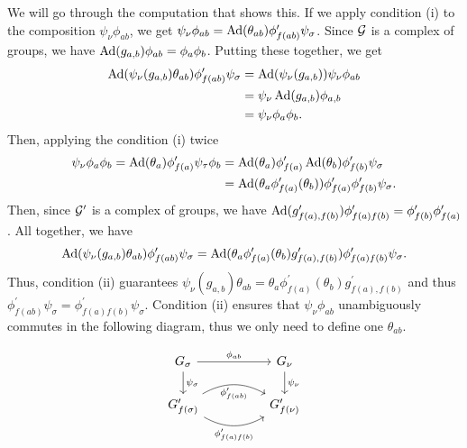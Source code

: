 We will go through the computation that shows this.
If we apply condition (i) to the composition $\psi_\nu \phi_{ab}$, we get $\psi_\nu\phi_{ab} = \operatorname{Ad}(\theta_{ab})\phi^\prime_{f(ab)}\psi_\sigma$.
Since $\mathcal{G}$ is a complex of groups, we have $\operatorname{Ad}(g_{a,b})\phi_{ab} = \phi_a\phi_b$.
Putting these together, we get
\begin{align*}
	\operatorname{Ad}(\psi_\nu(g_{a,b})\theta_{ab})\phi^\prime_{f(ab)}\psi_\sigma
	 & = \operatorname{Ad}(\psi_\nu(g_{a,b}))\psi_\nu\phi_{ab} \\
	 & = \psi_\nu\operatorname{Ad}(g_{a,b})\phi_{a,b}          \\
	 & = \psi_\nu\phi_a\phi_b
	.
\end{align*}
Then, applying the condition (i) twice
\begin{align*}
	\psi_\nu\phi_a\phi_b
	= \operatorname{Ad}(\theta_a)\phi^\prime_{f(a)}\psi_\tau\phi_b
	 & = \operatorname{Ad}(\theta_a)\phi^\prime_{f(a)}\operatorname{Ad}(\theta_b)\phi^\prime_{f(b)}\psi_\sigma                \\
	 & = \operatorname{Ad}(\theta_a\phi^\prime_{f(a)}(\theta_b))\phi^\prime_{f(a)}\phi^\prime_{f(b)}\psi_\sigma
	.
\end{align*}
Then, since $\mathcal{G}^\prime$ is a complex of groups, we have $\operatorname{Ad}(g^\prime_{f(a),f(b)})\phi^\prime_{f(a)f(b)} = \phi^\prime_{f(b)}\phi^\prime_{f(a)}$.
All together, we have
\begin{align*}
	\operatorname{Ad}(\psi_\nu(g_{a,b})\theta_{ab})\phi^\prime_{f(ab)}\psi_\sigma = \operatorname{Ad}(\theta_a\phi^\prime_{f(a)}(\theta_b)g^\prime_{f(a),f(b)})\phi^\prime_{f(a)f(b)}\psi_\sigma
	.
\end{align*}
Thus, condition (ii) guarantees $\psi_\nu(g_{a,b})\theta_{ab} = \theta_a\phi^\prime_{f(a)}(\theta_b)g^\prime_{f(a),f(b)}$ and thus $\phi^\prime_{f(ab)}\psi_\sigma = \phi^\prime_{f(a)f(b)}\psi_\sigma$.
Condition (ii) ensures that $\psi_\nu\phi_{ab}$ unambiguously commutes in the following diagram, thus we only need to define one $\theta_{ab}$.

\begin{equation*}
	\begin{tikzcd}
		G_\sigma \ar[d, "\psi_\sigma"] \ar[rr, "\phi_{ab}"] & &  G_\nu \ar[d, "\psi_\nu"]\\
		G^\prime_{f(\sigma)} \ar[rr, bend right, "\phi^\prime_{f(a)f(b)}"'] \ar[rr, bend left, "\phi^\prime_{f(ab)}"'] & & G^\prime_{f(\nu)}
	\end{tikzcd}
\end{equation*}

